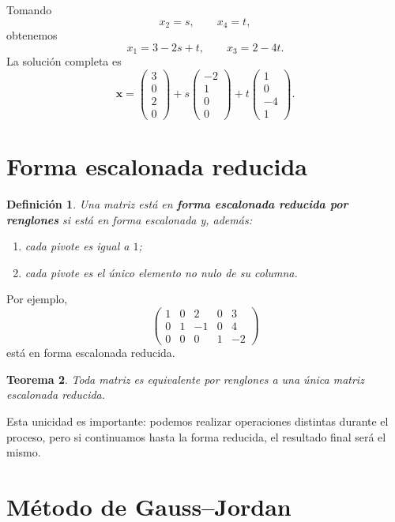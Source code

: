 \documentclass[12pt]{article}
\newtheorem{definicion}{Definición}[section]
\newtheorem{teorema}[definicion]{Teorema}
\theoremstyle{remark}
\begin{document}
Tomando
\[
x_2=s,\qquad x_4=t,
\]
obtenemos
\[
x_1=3-2s+t,\qquad x_3=2-4t.
\]
La solución completa es
\[
\mathbf{x}=
\begin{pmatrix}3\\0\\2\\0\end{pmatrix}
+s\begin{pmatrix}-2\\1\\0\\0\end{pmatrix}
+t\begin{pmatrix}1\\0\\-4\\1\end{pmatrix}.
\]

\section{Forma escalonada reducida}

\begin{definicion}
Una matriz está en \textbf{forma escalonada reducida por renglones} si está en forma escalonada y,
además:
\begin{enumerate}
\item cada pivote es igual a $1$;
\item cada pivote es el único elemento no nulo de su columna.
\end{enumerate}
\end{definicion}

Por ejemplo,
\[
\begin{pmatrix}
1&0&2&0&3\\
0&1&-1&0&4\\
0&0&0&1&-2
\end{pmatrix}
\]
está en forma escalonada reducida.

\begin{teorema}
Toda matriz es equivalente por renglones a una única matriz escalonada reducida.
\end{teorema}

Esta unicidad es importante: podemos realizar operaciones distintas durante el proceso, pero si
continuamos hasta la forma reducida, el resultado final será el mismo.

\section{Método de Gauss--Jordan}
\end{document}
